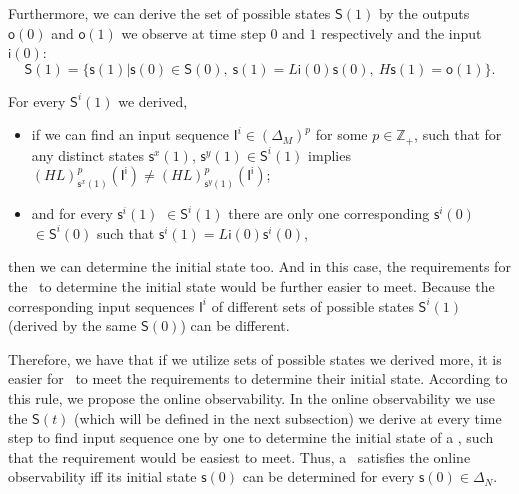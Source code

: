 Furthermore, we can derive the set of possible states $\mathsf{S}(1)$ by the outputs $\mathsf{o}(0)$ and $\mathsf{o}(1)$ we observe at time step $0$ and $1$ respectively and the input $\mathsf{i}(0)$:
\[\mathsf{S}(1)=\{\mathsf{s}(1)|\mathsf{s}(0)\in \mathsf{S}(0),\ \mathsf{s}(1)=L{\mathsf{i}(0)}{\mathsf{s}(0)},\ H \mathsf{s}(1)=\mathsf{o}(1)\}.\]

For every $\mathsf{S}^{i}(1)$ we derived, 
\begin{itemize}
  \item if we can find an input sequence $\mathsf{I}^{i}\in(\Delta_M)^p$ for some $p\in \mathbb{Z}_+$, such that for any distinct states $\mathsf{s}^{x}(1)$, $\mathsf{s}^{y}(1) \in \mathsf{S}^{i}(1)$ implies $(HL)^p_{\mathsf{s}^{x}(1)}(\mathsf{I^i})\neq (HL)^p_{\mathsf{s}^{y}(1)}(\mathsf{I^i})$;
  \item  and for every $\mathsf{s}^{i}(1)$ $\in \mathsf{S}^{i}(1)$ there are only one corresponding $\mathsf{s}^{i}(0)$ $\in \mathsf{S}^{i}(0)$ such that $\mathsf{s}^{i}(1)=L{\mathsf{i}(0)}{\mathsf{s}^{i}(0)}$,
\end{itemize} 
then we can determine the initial state too. And in this case, the requirements for the \BCN\ to determine the initial state would be further easier to meet. Because the corresponding input sequences $\mathsf{I}^{i}$ of different sets of possible states $\mathsf{S}^{i}(1)$ (derived by the same $\mathsf{S}(0)$) can be different. 

Therefore, we have that if we utilize sets of possible states we derived more, it is easier for \BCNs\ to meet the requirements to determine their initial state. According to this rule, we propose the online observability. In the online observability we use the $\mathsf{S}(t)$ (which will be defined in the next subsection) we derive at every time step to find input sequence one by one to determine the initial state of a \BCN, such that the requirement would be easiest to meet. Thus, a \BCN\ satisfies the online observability iff its initial state $\mathsf{s}(0)$ can be determined for every $\mathsf{s}(0) \in \Delta_N$.


